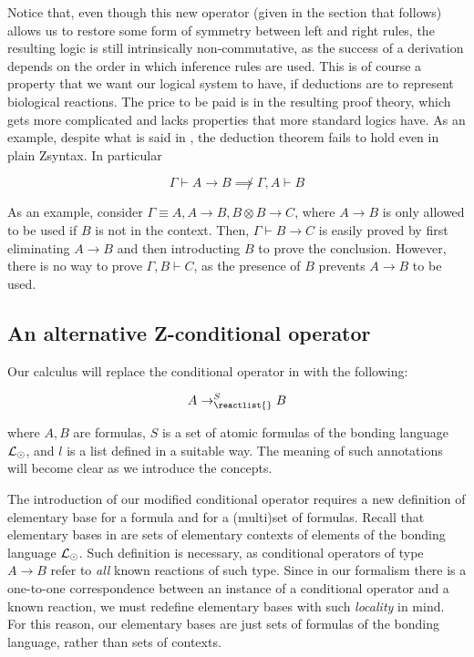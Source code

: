 Notice that, even though this new operator (given in the section that follows)
allows us to restore some form of symmetry between left and right rules, the
resulting logic is still intrinsically non-commutative, as the success of a
derivation depends on the order in which inference rules are used. This is of
course a property that we want our logical system to have, if deductions are to
represent biological reactions. The price to be paid is in the resulting proof
theory, which gets more complicated and lacks properties that more standard
logics have. As an example, despite what is said in \cite{adding-logic}, the
deduction theorem fails to hold even in plain Zsyntax. In particular

\[
  \Gamma \vdash A \rightarrow B \not\implies \Gamma, A \vdash B
\]

As an example, consider $\Gamma \equiv A, A \rightarrow B, B \otimes B
\rightarrow C$, where $A \rightarrow B$ is only allowed to be used if $B$ is not
in the context. Then, $\Gamma \vdash B \rightarrow C$ is easily proved by first
eliminating $A \rightarrow B$ and then introducting $B$ to prove the conclusion.
However, there is no way to prove $\Gamma, B \vdash C$, as the presence of $B$
prevents $A \rightarrow B$ to be used.

\subsection{An alternative Z-conditional operator}

Our calculus \eznd{} will replace the conditional operator in \znd{} with the
following:

\[
  A \rightarrow_{\reactlist{}}^S B
\]

where $A,B$ are formulas, $S$ is a set of atomic formulas of the bonding
language $\mathcal{L}_{\odot}$, and $l$ is a list defined in a suitable way. The
meaning of such annotations will become clear as we introduce the concepts.

The introduction of our modified conditional operator requires a new definition
of elementary base for a formula and for a (multi)set of formulas. Recall that
elementary bases in \cite{adding-logic} are sets of elementary contexts of
elements of the bonding language $\mathcal{L}_{\odot}$. Such definition is necessary,
as conditional operators of type $A \rightarrow B$ refer to \emph{all} known
reactions of such type. Since in our formalism there is a one-to-one
correspondence between an instance of a conditional operator and a known
reaction, we must redefine elementary bases with such \emph{locality} in mind.
For this reason, our elementary bases are just sets of formulas of the bonding
language, rather than sets of contexts.

